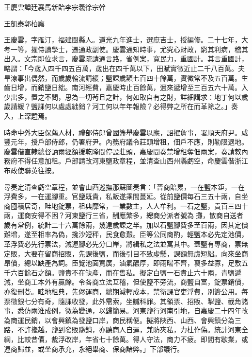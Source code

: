 
\begin{pinyinscope}
王慶雲譚廷襄馬新貽李宗羲徐宗幹

王凱泰郭柏廕

王慶雲，字雁汀，福建閩縣人。道光九年進士，選庶吉士，授編修。二十七年，大考一等，擢侍讀學士，遷通政副使。慶雲通知時事，尤究心財政，窮其利病，稽其出入。文宗即位求言，慶雲疏請通言路，省例案，寬民力，重國計。其言重國計，略謂：「今歲入四千四五百萬，歲出在四千萬以下，田賦實徵近止二千八百萬。夫旱潦事出偶然，而歲歲輪流請緩；鹽課歲額七百四十餘萬，實徵常不及五百萬。生齒日增，而銷鹽日絀。南河經費，嘉慶時止百餘萬，邇來遞增至三百五六十萬。入少出多，置之不問，思為一切茍且之計，何如取自有之財，詳細講求：地丁何以歲歲請緩？鹽課何以處處絀銷？河工何以年年報險？必得弊之所在而革除之。」奏入，上深韙焉。

時命中外大臣保薦人材，禮部侍郎曾國籓舉慶雲以應，詔擢詹事，署順天府尹。咸豐元年，授戶部侍郎，仍署府尹。內務府議令莊頭增租，佃戶不應，則勒限退地。慶雲偕直隸總督訥爾經額援乾隆間停設莊頭，嘉慶間奏禁增租奪佃兩案，奏請敕內務府不得任意加租。戶部請改河東鹽政章程，並清查山西州縣虧空，命慶雲偕浙江布政使聯英往按。

尋奏定清查虧空章程，並會山西巡撫那蘇圖奏言：「晉商賠累，一在鹽本鉅，一在浮費多，一在運腳重。官鹽既貴，私販遂乘間蔓延。從前鹽價每石三五十兩，自坐商囤積居奇，畦地錠票，租典靡常，一業數主，人人牟利。一石之鹽，貴百三四十兩，運商安得不困？河東鹽行三省，酬應繁多，總商分派者號為攤，散商自送者歲有常例，統計二十六萬餘兩，幾達歲課之半。加以石鹽腳費多至百兩，因其定價難增，遂至相率為偽，攙沙短秤，民食愈艱。臣等公同商酌，輕鹽本必先定池價，革浮費必先行票法，減運腳必先分口岸，將緝私之法並寓其中。蓋鹽有專商，票無定販，大要在留商招販，先課後鹽，而後引目不致虛懸，課額無虞短絀。向來坐商昂價，總以缺產為詞。臣覽池面寬廣，滷氣醲厚，即雨暘不齊，裒多益寡，足敷五千六百餘石之額。鹽貴不在缺產，而在售私。擬定白鹽一石貴止六十兩，青鹽遞減，坐商工本外有贏餘。令各商立法互稽，但使鹽不旁流，商鹽自富，錠票銷價，亦復刪芟。畦地租典，先侭運商，總期減輕成本，禁衛課官吏浮費，別籌公用。每票徵銀七分有奇，隨課收發，此外需索，坐贓科罪。其領票、招販、掣鹽、截角諸事，悉仿兩淮成例，微為變通，以歸簡易。河東鹽行河南引地，自嘉慶二十四年改為商運民銷，以會興鎮為發鹽口岸，商民稱便。擬將陜西、山西、會興鎮分為三路，不許攙越，鹽到發販隨銷，亦聽商人自運，兼防夾私，力杜作偽。統計河東全綱，比較昔價，裁浮改岸，年省七十餘萬。得人守法，商力不疲。即間有歇業，或運商歸並，或坐商承充，永絕舉商、保商諸弊。」下部議行。


\end{pinyinscope}
